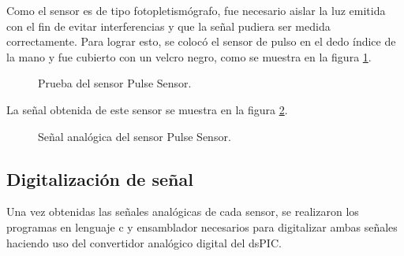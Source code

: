 Como el sensor es de tipo fotopletismógrafo, fue necesario aislar la luz emitida con el fin de evitar interferencias y que la señal pudiera ser medida correctamente. Para lograr esto, se colocó el sensor de pulso en el dedo índice de la mano y fue cubierto con un velcro negro, como se muestra en la figura \ref{fig:PulseSensor1}.\\

\begin{figure}[htbp!]
	\centering
	\caption{Prueba del sensor Pulse Sensor.}
	\label{fig:PulseSensor1}
\end{figure}

La señal obtenida de este sensor se muestra en la figura \ref{fig:PulseSensor3}.	
\begin{figure}[htbp!]
	\centering
	\caption{Señal analógica del sensor Pulse Sensor.}
	\label{fig:PulseSensor3}
\end{figure}

\newpage	
\subsection{Digitalización de señal}
Una vez obtenidas las señales analógicas de cada sensor, se realizaron los programas en lenguaje c y ensamblador necesarios para digitalizar ambas señales haciendo uso del convertidor analógico digital del dsPIC.\\

